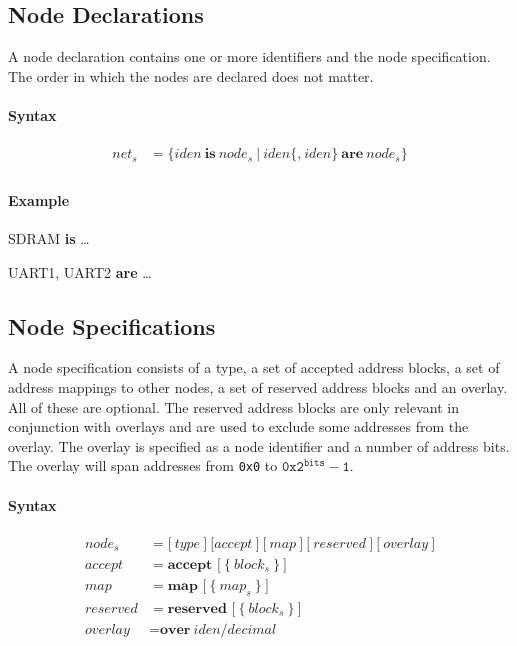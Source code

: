 \documentclass[a4paper,11pt,twoside]{report}
\begin{document}
{{{\subsection{Node Declarations}
A node declaration contains one or more identifiers and the node specification.
The order in which the nodes are declared does not matter.

\paragraph{Syntax}
\begin{align*}
\textit{net}_s & \mathop{=}
    \Big\{
        \textit{iden}\ \textbf{is}\ \textit{node}_s\
    \Big|\
        \textit{iden}\bigl\{\textbf{,}\ \textit{iden}\bigr\}\ \textbf{are}\ \textit{node}_s
    \Big\} \\
\end{align*}

\clearpage
\paragraph{Example}
\begin{example}
    SDRAM \textbf{is} \ldots

    UART1,
    UART2 \textbf{are} \ldots
\end{example}

\subsection{Node Specifications}
A node specification consists of a type, a set of accepted address blocks, a set of address mappings to other nodes, a set of reserved address blocks and an overlay.
All of these are optional.
The reserved address blocks are only relevant in conjunction with overlays and are used to exclude some addresses from the overlay.
The overlay is specified as a node identifier and a number of address bits.
The overlay will span addresses from \texttt{0x0} to \(\texttt{0x2}^\texttt{bits} - \texttt{1}\).

\paragraph{Syntax}
\begin{align*}
\textit{node}_s & \mathop{=}
    \Big[\ 
       \textit{type}\ 
    \Big]\  
    \Big[
       \textit{accept}\ 
    \Big]\ 
    \Big[\ 
       \textit{map}\ 
    \Big]\ 
    \Big[\ 
        \textit{reserved}\ 
    \Big]\ 
    \Big[\ 
        \textit{overlay}\ 
    \Big]\\
\textit{accept} & \mathop{=}
    \textbf{accept [}\ \big\{\ \textit{block}_s\ \big\}\ \textbf{]}\\
\textit{map} & \mathop{=}
    \textbf{map [}\ \big\{\ \textit{map}_s\ \big\}\ \textbf{]}\\
\textit{reserved} & \mathop{=}
    \textbf{reserved [}\ \big\{\ \textit{block}_s\ \big\}\ \textbf{]}\\
\textit{overlay} & \mathop{=}
    \textbf{over}\ \textit{iden}\textbf{/}\textit{decimal}\\
\end{align*}

}}}
\end{document}

